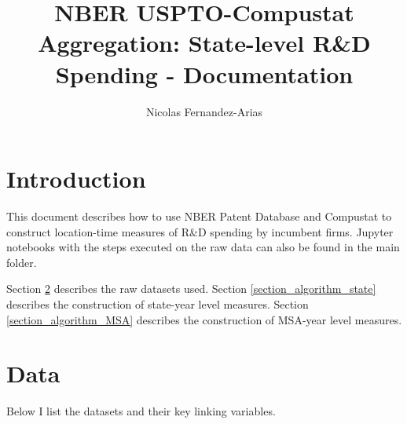 \documentclass[12pt,english]{article}
\theoremstyle{remark}
\begin{document}
	
	\title{NBER USPTO-Compustat Aggregation: State-level R\&D Spending - Documentation}
	\author{Nicolas Fernandez-Arias}
	\maketitle

\section{Introduction}

This document describes how to use NBER Patent Database and Compustat to construct location-time measures of R\&D spending by incumbent firms. Jupyter notebooks with the steps executed on the raw data can also be found in the main folder. 

Section \ref{section_data} describes the raw datasets used. Section \ref{section_algorithm_state} describes the construction of state-year level measures. Section \ref{section_algorithm_MSA} describes the construction of MSA-year level measures. 


\section{Data}\label{section_data}
Below I list the datasets and their key linking variables.
\end{document}
